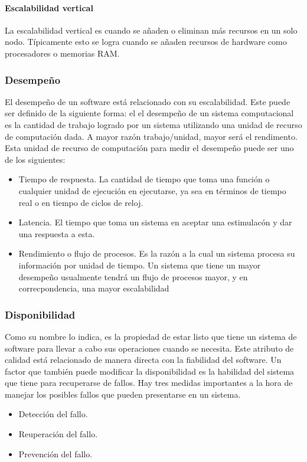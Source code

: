 \paragraph{Escalabilidad vertical} La escalabilidad vertical es cuando se añaden o eliminan más recursos en un solo nodo. Típicamente esto se logra cuando se añaden recursos de hardware como procesadores o memorias RAM.

\subsubsection{Desempeño} El desempeño de un software está relacionado con su escalabilidad. Este puede ser definido de la siguiente forma: el el desempeño de un sistema computacional es la cantidad de trabajo logrado por un sistema utilizando una unidad de recurso de computación dada. A mayor razón trabajo/unidad, mayor será el rendimento. Esta unidad de recurso de computación para medir el desempeño puede ser uno de los siguientes:

\begin{itemize}
    \item Tiempo de respuesta. La cantidad de tiempo que toma una función o cualquier unidad de ejecución en ejecutarse, ya sea en términos de tiempo real o en tiempo de ciclos de reloj.
    \item Latencia. El tiempo que toma un sistema en aceptar una estimulacón y dar una respuesta a esta.
    \item Rendimiento o flujo de procesos. Es la razón a la cual un sistema procesa su información por unidad de tiempo. Un sistema que tiene un mayor desempeño usualmente tendrá un flujo de procesos mayor, y en correcpondencia, una mayor escalabilidad
\end{itemize}

\subsubsection{Disponibilidad} Como su nombre lo indica, es la propiedad de estar listo que tiene un sistema de software para llevar a cabo sus operaciones cuando se necesita. Este atributo de calidad está relacionado de manera directa con la fiabilidad del software. Un factor que también puede modificar la disponibilidad es la habilidad del sistema que tiene para recuperarse de fallos. Hay tres medidas importantes a la hora de manejar los posibles fallos que pueden presentarse en un sistema.

\begin{itemize}
    \item Detección del fallo.
    \item Reuperación del fallo.
    \item Prevención del fallo.
\end{itemize}

